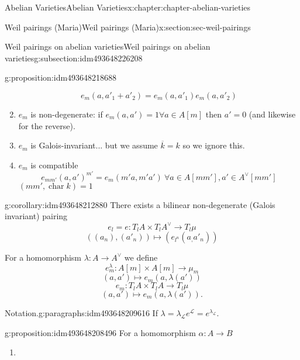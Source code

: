 \documentclass[oneside,10pt,]{book}
\numberwithin{equation}{section}
\newcommand{\sheaf}[1]{\operatorname{\mathcal{#1}}}
\newcommand{\lb}{[}
\newcommand{\rb}{]}
\DeclareMathOperator{\characteristic}{char}
\begin{document}
\begin{chapterptx}{Abelian Varieties}{}{Abelian Varieties}{}{}{x:chapter:chapter-abelian-varieties}
\begin{sectionptx}{Weil pairings (Maria)}{}{Weil pairings (Maria)}{}{}{x:section:sec-weil-pairings}
\begin{subsectionptx}{Weil pairings on abelian varieties}{}{Weil pairings on abelian varieties}{}{}{g:subsection:idm493648226208}
\begin{proposition}{}{}{g:proposition:idm493648218688}
\begin{enumerate}
%
\begin{equation*}
e_m(a,a'_1+a'_2) = e_m(a,a'_1)e_m(a,a'_2)
\end{equation*}
%
\item{}\(e_m\) is non-degenerate: if \(e_m(a,a') = 1 \forall a\in A\lb m\rb\) then \(a' = 0\) (and likewise for the reverse).%
\item{}\(e_m\) is Galois-invariant... but we assume \(\overline k =k\) so we ignore this.%
\item{}\(e_m\) is compatible%
\begin{equation*}
e_{mm'} (a,a')^{m'} = e_m(m'a, m'a') \ \forall a \in A[mm'], a'\in A^\vee [mm']
\end{equation*}
\((mm',\characteristic k) = 1\)%
\end{enumerate}
%
\end{proposition}
\begin{corollary}{}{}{g:corollary:idm493648212880}%
There exists a bilinear non-degenerate (Galois invariant) pairing%
\begin{equation*}
e_l = e \colon T_lA \times T_lA^\vee \to T_l\mu
\end{equation*}
%
\begin{equation*}
((a_n), (a'_n)) \mapsto (e_{l^n}(a_,a'_n))
\end{equation*}
%
\end{corollary}
For a homomorphism \(\lambda \colon A \to A^\vee\) we define%
\begin{equation*}
e_m^\lambda \colon A[m]\times A [m] \to \mu_m
\end{equation*}
%
\begin{equation*}
(a,a') \mapsto e_m(a, \lambda(a'))
\end{equation*}
%
\begin{equation*}
e_m \colon T_lA\times T_l A \to T_l \mu
\end{equation*}
%
\begin{equation*}
(a,a') \mapsto e_m(a, \lambda(a'))\text{.}
\end{equation*}
%
\begin{paragraphs}{Notation.}{g:paragraphs:idm493648209616}%
If \(\lambda = \lambda_{\sheaf L} e^{\sheaf L} = e^{\lambda_{\sheaf L}}\).%
\end{paragraphs}%
\begin{proposition}{}{}{g:proposition:idm493648208496}%
For a homomorphism \(\alpha \colon A \to B\)%
\begin{enumerate}
\item{}%
\begin{equation*}

\end{equation*}
\end{enumerate}
\end{proposition}
\end{subsectionptx}
\end{sectionptx}
\end{chapterptx}
\end{document}
